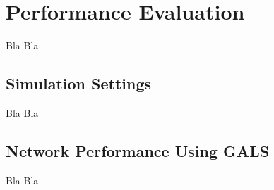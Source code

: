 \chapter{Performance Evaluation}\label{sec:Er}
Bla Bla

\section{Simulation Settings}\label{simuset}
Bla Bla



\section{Network Performance Using GALS}\label{net1}
Bla Bla


